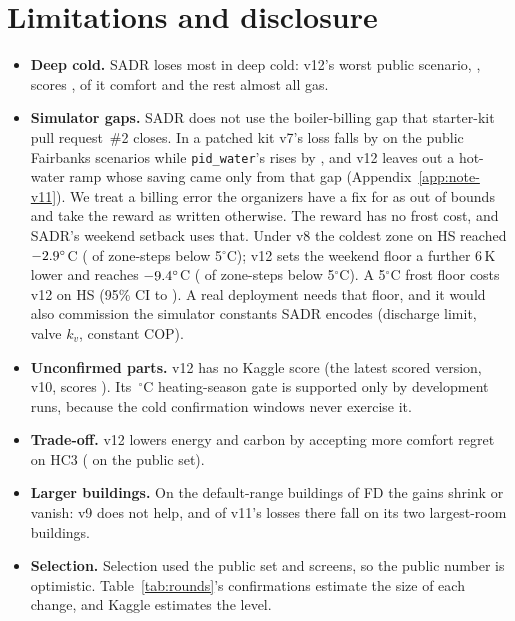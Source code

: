 \documentclass{article}
\begin{document}
\section{Limitations and disclosure}
\label{sec:limits}
\begin{itemize}
\item \textbf{Deep cold.} SADR loses most in deep cold: v12's worst public scenario, \RElvWorstPubScen, scores \RElvWorstPub, \RElvWorstPubComfortShare{} of it comfort and the rest almost all gas.
\item \textbf{Simulator gaps.} SADR does not use the boiler-billing gap that starter-kit pull request~\#2 closes. In a patched kit v7's loss falls by \RFivePrTwoVSevenRelAbs{} on the \RFivePrTwoVSevenN{} public Fairbanks scenarios while \texttt{pid\_water}'s rises by \RFivePrTwoPidRelAbs, and v12 leaves out a hot-water ramp whose saving came only from that gap (Appendix~\ref{app:note-v11}). We treat a billing error the organizers have a fix for as out of bounds and take the reward as written otherwise. The reward has no frost cost, and SADR's weekend setback uses that. Under v8 the coldest zone on HS reached $-2.9^\circ$C (\RSixDecBelowFive{} of zone-steps below 5$^\circ$C); v12 sets the weekend floor a further 6\,K lower and reaches $-9.4^\circ$C (\RElvBelowFiveHS{} of zone-steps below 5$^\circ$C). A 5$^\circ$C frost floor costs v12 \RElvFrostHsRel{} on HS (95\% CI \RElvFrostHsLo{} to \RElvFrostHsHi). A real deployment needs that floor, and it would also commission the simulator constants SADR encodes (discharge limit, valve $k_v$, constant COP).
\item \textbf{Unconfirmed parts.} v12 has no Kaggle score (the latest scored version, v10, scores \REigKagVTen). Its \RTenSeasonOatC\,$^\circ$C heating-season gate is supported only by development runs, because the cold confirmation windows never exercise it.
\item \textbf{Trade-off.} v12 lowers energy and carbon by accepting \RTenComfRiseHCThree{} more comfort regret on HC3 (\RTenComfRisePub{} on the public set).
\item \textbf{Larger buildings.} On the default-range buildings of FD the gains shrink or vanish: v9 does not help, and \RNineFDTopTwoLosses{} of v11's \RNineConfFreshDefLosses{} losses there fall on its two largest-room buildings.
\item \textbf{Selection.} Selection used the public set and screens, so the public number is optimistic. Table~\ref{tab:rounds}'s confirmations estimate the size of each change, and Kaggle estimates the level.

\end{itemize}
\end{document}
